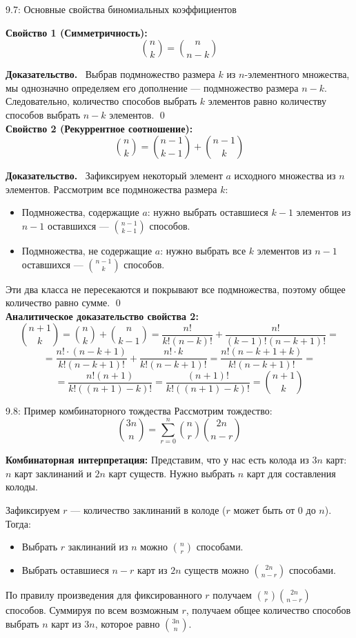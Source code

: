 \documentclass[a4paper,12pt]{article}
\newcommand{\myproof}{\textbf{Доказательство.}\ }
\begin{document}
	\begin{propertybox}{9.7: Основные свойства биномиальных коэффициентов}
		
		\textbf{Свойство 1 (Симметричность):}
		\[ \binom{n}{k} = \binom{n}{n-k} \]
		
		\myproof
		Выбрав подмножество размера $k$ из $n$-элементного множества, мы однозначно определяем его дополнение — подмножество размера $n-k$. Следовательно, количество способов выбрать $k$ элементов равно количеству способов выбрать $n-k$ элементов. \qed \\
		
		\textbf{Свойство 2 (Рекуррентное соотношение):}
		\[ \binom{n}{k} = \binom{n-1}{k-1} + \binom{n-1}{k} \]
		
		\myproof
		Зафиксируем некоторый элемент $a$ исходного множества из $n$ элементов. Рассмотрим все подмножества размера $k$:
		\begin{itemize}
			\item Подмножества, содержащие $a$: нужно выбрать оставшиеся $k-1$ элементов из $n-1$ оставшихся — $\binom{n-1}{k-1}$ способов.
			\item Подмножества, не содержащие $a$: нужно выбрать все $k$ элементов из $n-1$ оставшихся — $\binom{n-1}{k}$ способов.
		\end{itemize}
		Эти два класса не пересекаются и покрывают все подмножества, поэтому общее количество равно сумме. \qed \\
		
		\textbf{Аналитическое доказательство свойства 2:}
		\[ \binom{n+1}{k} = \binom{n}{k} + \binom{n}{k-1} = \frac{n!}{k!(n-k)!} + \frac{n!}{(k-1)!(n-k+1)!} = \]
		\[ = \frac{n! \cdot (n-k+1)}{k!(n-k+1)!} + \frac{n! \cdot k}{k!(n-k+1)!} = \frac{n!(n-k+1+k)}{k!(n-k+1)!} = \]
		\[ = \frac{n!(n+1)}{k!((n+1)-k)!} = \frac{(n+1)!}{k!((n+1)-k)!} = \binom{n+1}{k} \]
	\end{propertybox}
	
	\begin{examplebox}{9.8: Пример комбинаторного тождества}
		Рассмотрим тождество:
		\[ \binom{3n}{n} = \sum_{r=0}^n \binom{n}{r} \binom{2n}{n-r} \]
		
		\textbf{Комбинаторная интерпретация:}
		Представим, что у нас есть колода из $3n$ карт: $n$ карт заклинаний и $2n$ карт существ. Нужно выбрать $n$ карт для составления колоды.
		
		Зафиксируем $r$ — количество заклинаний в колоде ($r$ может быть от $0$ до $n$). Тогда:
		\begin{itemize}
			\item Выбрать $r$ заклинаний из $n$ можно $\binom{n}{r}$ способами.
			\item Выбрать оставшиеся $n-r$ карт из $2n$ существ можно $\binom{2n}{n-r}$ способами.
		\end{itemize}
		По правилу произведения для фиксированного $r$ получаем $\binom{n}{r} \binom{2n}{n-r}$ способов. Суммируя по всем возможным $r$, получаем общее количество способов выбрать $n$ карт из $3n$, которое равно $\binom{3n}{n}$.
	\end{examplebox}
	
\end{document}
